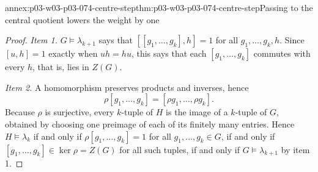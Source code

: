 \begin{annexitem}{annex:p03-w03-p03-074-centre-step}{thm:p03-w03-p03-074-centre-step}{Passing to the central quotient lowers the weight by one}
\begin{proof}
\emph{Item 1.} \(G\models\lambda_{k+1}\) says that
\([[g_1,\ldots,g_k],h]=1\) for all \(g_1,\ldots,g_k,h\). Since
\([u,h]=1\) exactly when \(uh=hu\), this says that each
\([g_1,\ldots,g_k]\) commutes with every \(h\), that is, lies in
\(Z(G)\).

\emph{Item 2.} A homomorphism preserves products and inverses, hence
\[
 \rho[g_1,\ldots,g_k]=[\rho g_1,\ldots,\rho g_k].
\] Because \(\rho\) is
surjective, every \(k\)-tuple of \(H\) is the image of a \(k\)-tuple of
\(G\), obtained by choosing one preimage of each of its finitely many
entries. Hence \(H\models\lambda_k\) if and only if
\(\rho[g_1,\ldots,g_k]=1\) for all \(g_1,\ldots,g_k\in G\), if and only if
\([g_1,\ldots,g_k]\in\ker\rho=Z(G)\) for all such tuples, if and only if
\(G\models\lambda_{k+1}\) by item 1.
\end{proof}
\end{annexitem}

